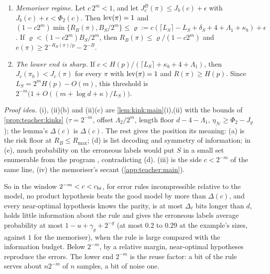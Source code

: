 \begin{theorem}
\begin{enumerate}[label=(\roman*),start=1,itemsep=1pt,topsep=2pt]
\begin{enumerate}[label=(\alph*),itemsep=0pt,topsep=1pt]
\end{enumerate}
\item \emph{Memoriser regime.} Let $c\,2^m<1$, and let $J^B_c(\pi)\le J_b(c)+\epsilon$ with $J_b(c)+\epsilon<\Phi_2(c)$. Then $\operatorname{lev}(\pi)=1$ and $(1-c2^m)\min\{R_B(\pi),B_S/2^m\}\le\varrho:=c(\lceil L_S\rceil-L_S+\delta_S+4+\Lambda_1+\kappa_b)+\epsilon$. If $\varrho<(1-c2^m)B_S/2^m$, then $R_B(\pi)\le\varrho/(1-c2^m)$ and $e(\pi)\ge2^{-R_B(\pi)/p}-2^{-B}$.
\item \emph{The lower end is sharp.} If $c<H(p)/(\lceil L_S\rceil+\kappa_b+4+\Lambda_1)$, then $J_c(\pi_b)<J_c(\pi)$ for every $\pi$ with $\operatorname{lev}(\pi)=1$ and $R(\pi)\ge H(p)$. Since $L_S=2^mH(p)-O(m)$, this threshold is $2^{-m}\big(1+O((m+\log d+\kappa)/L_S)\big)$.
\end{enumerate}
\end{theorem}

\emph{Proof idea.} (i), (ii)(b) and (ii)(c) are \cref{lem:kink:main}(i),(ii) with the bounds of \cref{prop:teacher:kinks} ($\tau=2^{-m}$, offset $\Lambda_2/2^m$, length floor $d-4-\Lambda_1$, $\eta_{\mathcal N}\ge\Phi_2-J_g$); the lemma's $\Delta(c)$ is $\Delta(c)$. The rest gives the position its meaning: (a) is the risk floor at $R_B\le R_{\max}$; (d) is list decoding and symmetry of information; in (e), much probability on the erroneous labels would put $S$ in a small set enumerable from the program \citep{hoeffding1963probability}, contradicting (d). (iii) is the side $c<2^{-m}$ of the same line, (iv) the memoriser's secant (\cref{app:teacher:main}).

So in the window $2^{-m}<c<c_{\rm hi}$, for error rules incompressible relative to the model, no product hypothesis beats the good model by more than $\Delta(c)$, and every near-optimal hypothesis knows the parity, is at most $\Delta_\ell$ bits longer than $d$, holds little information about the rule and gives the erroneous labels average probability at most $1-u+\gamma_g+2^{-g}$ (at most $0.2$ to $0.29$ at the example's sizes, against $1$ for the memoriser), when the rule is large compared with the information budget. Below $2^{-m}$, by a relative margin, near-optimal hypotheses reproduce the errors. The lower end $2^{-m}$ is the reuse factor: a bit of the rule serves about $n2^{-m}$ of $n$ samples, a bit of noise one.

